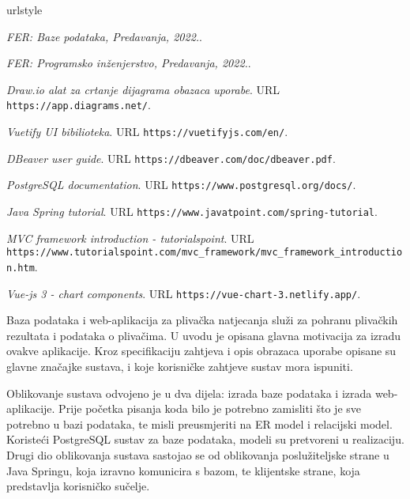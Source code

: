 \documentclass[times, utf8, zavrsni]{fer}
\begin{document}


\begin{thebibliography}{19}
    \providecommand{\natexlab}[1]{#1}
    \providecommand{\url}[1]{\texttt{#1}}
    \expandafter\ifx\csname urlstyle\endcsname\relax
      \providecommand{\doi}[1]{doi: #1}\else
      \providecommand{\doi}{doi: \begingroup \urlstyle{rm}\Url}\fi

      \emph{FER: Baze podataka, Predavanja, 2022.}.
      \newblock

      \emph{FER: Programsko inženjerstvo, Predavanja, 2022.}.
      \newblock

      \emph{Draw.io alat za crtanje dijagrama obazaca uporabe}.
      \newblock URL \url{https://app.diagrams.net/}.

      \emph{Vuetify UI bibilioteka}.
      \newblock URL \url{https://vuetifyjs.com/en/}.

      \emph{DBeaver user guide}.
      \newblock URL \url{https://dbeaver.com/doc/dbeaver.pdf}.

      \emph{PostgreSQL documentation}.
      \newblock URL \url{https://www.postgresql.org/docs/}.

      \emph{Java Spring tutorial}.
      \newblock URL \url{https://www.javatpoint.com/spring-tutorial}.

      \emph{MVC framework introduction - tutorialspoint}.
      \newblock URL \url{https://www.tutorialspoint.com/mvc_framework/mvc_framework_introduction.htm}.

      \emph{Vue-js 3 - chart components}.
      \newblock URL \url{https://vue-chart-3.netlify.app/}.
    
\end{thebibliography}

\listoffigures


\begin{sazetak}
Baza podataka i web-aplikacija za plivačka natjecanja služi za pohranu plivačkih rezultata i podataka o plivačima.
U uvodu je opisana glavna motivacija za izradu ovakve aplikacije. Kroz specifikaciju zahtjeva i opis obrazaca
uporabe opisane su glavne značajke sustava, i koje korisničke zahtjeve sustav mora ispuniti. 

Oblikovanje sustava odvojeno je u dva dijela: izrada baze podataka i izrada web-aplikacije. Prije početka pisanja
koda bilo je potrebno zamisliti što je sve potrebno u bazi podataka, te misli preusmjeriti na ER model i relacijski model.
Koristeći PostgreSQL sustav za baze podataka, modeli su pretvoreni u realizaciju. Drugi dio oblikovanja sustava sastojao se od
oblikovanja poslužiteljske strane u Java Springu, koja izravno komunicira s bazom, te klijentske strane, koja predstavlja korisničko
sučelje. 

\end{sazetak}
\end{document}
